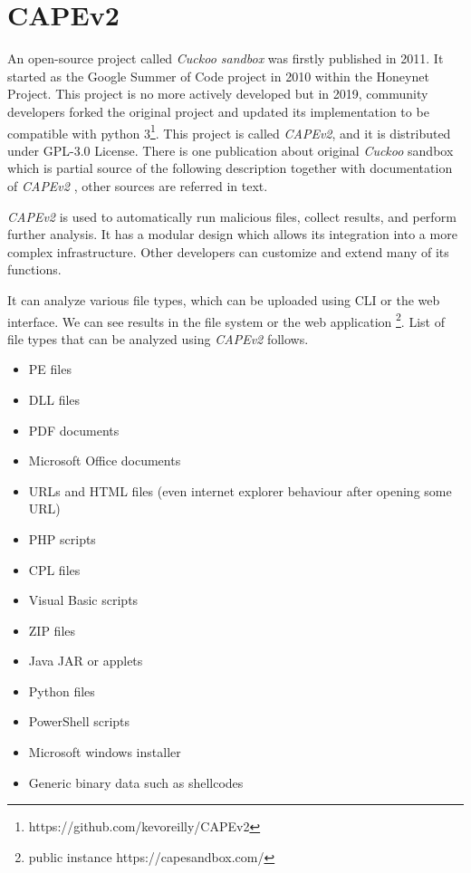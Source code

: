 \section{CAPEv2}
An open-source project called \emph{Cuckoo sandbox} was firstly published in 2011. It started as the Google Summer of Code project in 2010 within the Honeynet Project. This project is no more actively developed but in 2019, community developers forked the original project and updated its implementation to be compatible with python 3\footnote{https://github.com/kevoreilly/CAPEv2}. This project is called \emph{CAPEv2}, and it is distributed under GPL-3.0 License. There is one publication about original \emph{Cuckoo} sandbox \cite{Oktavianto2013} which is partial source of the following description together with documentation of \emph{CAPEv2} \cite{CAPESand75:online}, other sources are referred in text.

\emph{CAPEv2} is used to automatically run malicious files, collect results, and perform further analysis. It has a modular design which allows its integration into a more complex infrastructure. Other developers can customize and extend many of its functions.

It can analyze various file types, which can be uploaded using CLI  or the web interface. We can see results in the file system or the web application \footnote{public instance https://capesandbox.com/}. List of file types that can be analyzed using \emph{CAPEv2} follows.
\begin{itemize}
  \item PE files
  \item DLL files
  \item PDF documents
  \item Microsoft Office documents
  \item URLs and HTML files (even internet explorer behaviour after opening some URL)
  \item PHP scripts
  \item CPL files
  \item Visual Basic scripts
  \item ZIP files
  \item Java JAR or applets
  \item Python files 
  \item PowerShell scripts
  \item Microsoft windows installer
  \item Generic binary data such as shellcodes
\end{itemize}


